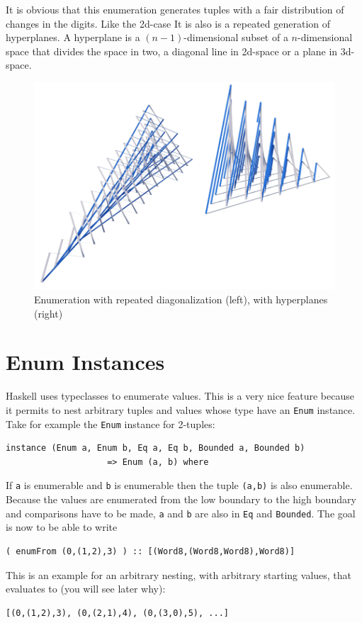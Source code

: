 \documentclass{tmr}
\begin{document}
It is obvious that this enumeration generates tuples with a fair distribution of changes in the digits. Like the 2d-case It is also is a repeated generation of hyperplanes. A hyperplane is a $(n-1)$-dimensional subset of a $n$-dimensional space that divides the space in two, \eg  a diagonal line in 2d-space or a plane in 3d-space.

\begin{figure}[htbp]
  \centering
    \includegraphics[width=\textwidth]{enumerate2.png}
  \caption{Enumeration with repeated diagonalization (left), with hyperplanes (right)}
  \label{enum3}
\end{figure}

\section { Enum Instances}
Haskell uses typeclasses to enumerate values. This is a very nice feature because it permits to nest arbitrary tuples and values whose type have an \verb|Enum| instance. Take for example the \verb|Enum| instance for 2-tuples:

\begin{Verbatim}
instance (Enum a, Enum b, Eq a, Eq b, Bounded a, Bounded b)
                    => Enum (a, b) where
\end{Verbatim}
If \verb|a| is enumerable and \verb|b| is enumerable then the tuple \verb|(a,b)| is also enumerable. Because the values are enumerated from the low boundary to the high boundary and comparisons have to be made, \verb|a| and \verb|b| are also in \verb|Eq| and \verb|Bounded|.
The goal is now to be able to write
\begin{Verbatim}
( enumFrom (0,(1,2),3) ) :: [(Word8,(Word8,Word8),Word8)]
\end{Verbatim}
This is an example for an arbitrary nesting, with arbitrary starting values, that evaluates to (you will see later why):
\begin{Verbatim}
[(0,(1,2),3), (0,(2,1),4), (0,(3,0),5), ...]
\end{Verbatim}
\end{document}
